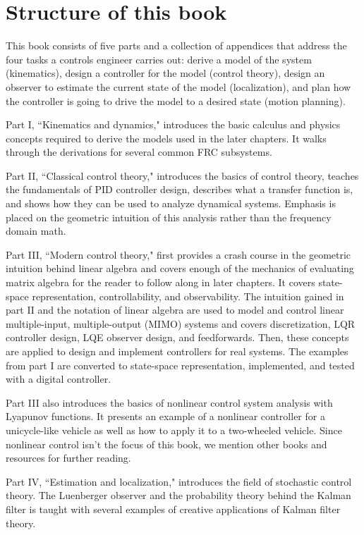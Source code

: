 \section{Structure of this book}

This book consists of five parts and a collection of appendices that address the
four tasks a controls engineer carries out: derive a model of the system
(kinematics), design a controller for the model (control theory), design an
observer to estimate the current state of the model (localization), and plan how
the controller is going to drive the model to a desired state (motion planning).

Part I, ``Kinematics and dynamics," introduces the basic calculus and physics
concepts required to derive the models used in the later chapters. It walks
through the derivations for several common FRC subsystems.

Part II, ``Classical control theory," introduces the basics of control theory,
teaches the fundamentals of PID controller design, describes what a transfer
function is, and shows how they can be used to analyze dynamical systems.
Emphasis is placed on the geometric intuition of this analysis rather than the
frequency domain math.

Part III, ``Modern control theory," first provides a crash course in the
geometric intuition behind linear algebra and covers enough of the mechanics of
evaluating matrix algebra for the reader to follow along in later chapters. It
covers state-space representation, controllability, and observability. The
intuition gained in part II and the notation of linear algebra are used to model
and control linear multiple-input, multiple-output (MIMO) systems and covers
discretization, LQR controller design, LQE observer design, and feedforwards.
Then, these concepts are applied to design and implement controllers for real
systems. The examples from part I are converted to state-space representation,
implemented, and tested with a digital controller.

Part III also introduces the basics of nonlinear control system analysis with
Lyapunov functions. It presents an example of a nonlinear controller for a
unicycle-like vehicle as well as how to apply it to a two-wheeled vehicle. Since
nonlinear control isn't the focus of this book, we mention other books and
resources for further reading.

Part IV, ``Estimation and localization," introduces the field of stochastic
control theory. The Luenberger observer and the probability theory behind the
Kalman filter is taught with several examples of creative applications of Kalman
filter theory.

